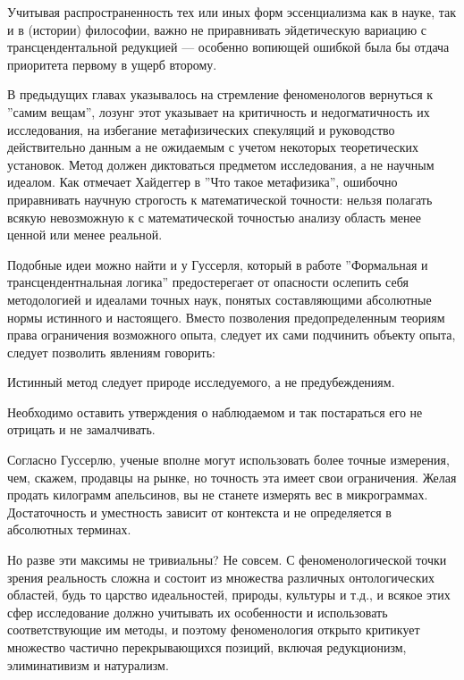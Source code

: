 \documentclass[11pt]{book}
\begin{document}
Учитывая распространенность тех или иных форм эссенциализма как в науке, так и в (истории) философии, важно не приравнивать эйдетическую вариацию с трансцендентальной редукцией --- особенно вопиющей ошибкой была бы отдача приоритета первому в ущерб второму.

В предыдущих главах указывалось на стремление феноменологов вернуться к ''самим вещам'', лозунг этот указывает на критичность и недогматичность их исследования, на избегание метафизических спекуляций и руководство действительно данным а не ожидаемым с учетом некоторых теоретических установок. Метод должен диктоваться предметом исследования, а не научным идеалом. Как отмечает Хайдеггер в ''Что такое метафизика'', ошибочно приравнивать научную строгость к математической точности: нельзя полагать всякую невозможную к с математической точностью анализу область менее ценной или менее реальной.

Подобные идеи можно найти и у Гуссерля, который в работе ''Формальная и трансцендентнальная логика'' предостерегает от опасности ослепить себя методологией и идеалами точных наук, понятых составляющими абсолютные нормы истинного и настоящего. Вместо позволения предопределенным теориям права ограничения возможного опыта, следует их сами подчинить объекту опыта, следует позволить явлениям говорить:

\smallskip
{}\relax
{}\relax

Истинный метод следует природе исследуемого, а не предубеждениям.

Необходимо оставить утверждения о наблюдаемом и так постараться его не отрицать и не замалчивать.

\relax
{}\relax
\smallskip

Согласно Гуссерлю, ученые вполне могут использовать более точные измерения, чем, скажем, продавцы на рынке, но точность эта имеет свои ограничения. Желая продать килограмм апельсинов, вы не станете измерять вес в микрограммах. Достаточность и уместность зависит от контекста и не определяется в абсолютных терминах.

Но разве эти максимы не тривиальны? Не совсем. С феноменологической точки зрения реальность сложна и состоит из множества различных онтологических областей, будь то царство идеальностей, природы, культуры и т.д., и всякое этих сфер исследование должно учитывать их особенности и использовать соответствующие им методы, и поэтому феноменология открыто критикует множество частично перекрывающихся позиций, включая редукционизм, элиминативизм и натурализм.
\end{document}
